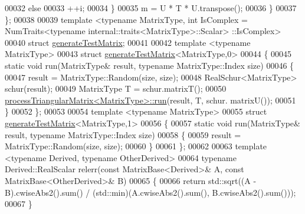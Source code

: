 \begin{DoxyCode}
00032       \textcolor{keywordflow}{else}
00033         ++i;
00034     \}
00035     m = U * T * U.transpose();
00036   \}
00037 \};
00038 
00039 template <typename MatrixType, int IsComplex = NumTraits<typename internal::traits<MatrixType>::Scalar>
      ::IsComplex>
00040 \textcolor{keyword}{struct }\hyperlink{structgenerate_test_matrix}{generateTestMatrix};
00041 
00042 \textcolor{keyword}{template} <\textcolor{keyword}{typename} MatrixType>
00043 \textcolor{keyword}{struct }\hyperlink{structgenerate_test_matrix}{generateTestMatrix}<MatrixType,0>
00044 \{
00045   \textcolor{keyword}{static} \textcolor{keywordtype}{void} run(MatrixType& result, \textcolor{keyword}{typename} MatrixType::Index size)
00046   \{
00047     result = MatrixType::Random(size, size);
00048     RealSchur<MatrixType> schur(result);
00049     MatrixType T = schur.matrixT();
00050     \hyperlink{structprocess_triangular_matrix}{processTriangularMatrix<MatrixType>::run}(result, T, schur.
      matrixU());
00051   \}
00052 \};
00053 
00054 \textcolor{keyword}{template} <\textcolor{keyword}{typename} MatrixType>
00055 \textcolor{keyword}{struct }\hyperlink{structgenerate_test_matrix}{generateTestMatrix}<MatrixType,1>
00056 \{
00057   \textcolor{keyword}{static} \textcolor{keywordtype}{void} run(MatrixType& result, \textcolor{keyword}{typename} MatrixType::Index size)
00058   \{
00059     result = MatrixType::Random(size, size);
00060   \}
00061 \};
00062 
00063 \textcolor{keyword}{template} <\textcolor{keyword}{typename} Derived, \textcolor{keyword}{typename} OtherDerived>
00064 \textcolor{keyword}{typename} Derived::RealScalar relerr(\textcolor{keyword}{const} MatrixBase<Derived>& A, \textcolor{keyword}{const} MatrixBase<OtherDerived>& B)
00065 \{
00066   \textcolor{keywordflow}{return} std::sqrt((A - B).cwiseAbs2().sum() / (std::min)(A.cwiseAbs2().sum(), B.cwiseAbs2().sum()));
00067 \}
\end{DoxyCode}

